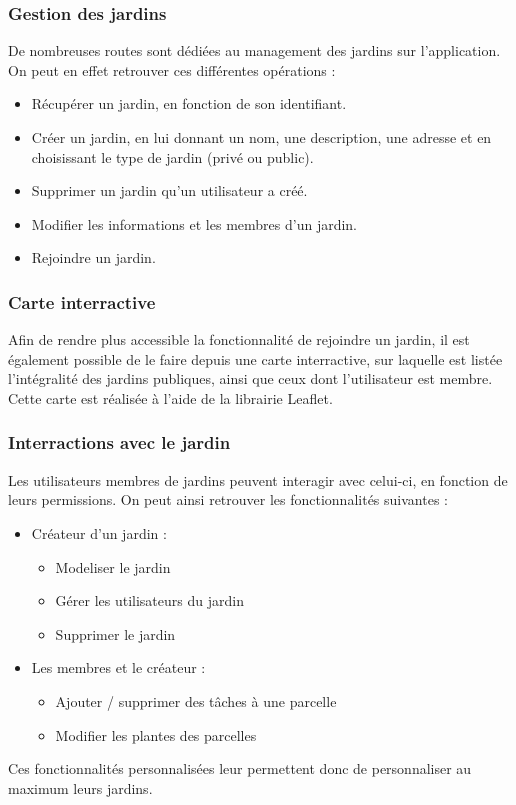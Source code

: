 \documentclass[french,a4paper]{article}
\begin{document}
\subsubsection{Gestion des jardins}
De nombreuses routes sont dédiées au management des jardins sur l'application. On peut en effet retrouver ces différentes opérations :
\begin{itemize}
    \item Récupérer un jardin, en fonction de son identifiant.
    \item Créer un jardin, en lui donnant un nom, une description, une adresse et en choisissant le type de jardin (privé ou public).
    \item Supprimer un jardin qu'un utilisateur a créé.
    \item Modifier les informations et les membres d'un jardin.
    \item Rejoindre un jardin.
\end{itemize}

\subsubsection{Carte interractive}
Afin de rendre plus accessible la fonctionnalité de rejoindre un jardin, il est également possible de le faire depuis une carte interractive, sur laquelle est listée l'intégralité des jardins publiques, ainsi que ceux dont l'utilisateur est membre. Cette carte est réalisée à l'aide de la librairie Leaflet.

\subsubsection{Interractions avec le jardin}
Les utilisateurs membres de jardins peuvent interagir avec celui-ci, en fonction de leurs permissions. On peut ainsi retrouver les fonctionnalités suivantes :
\begin{itemize}
    \item Créateur d'un jardin :
          \begin{itemize}
              \item Modeliser le jardin
              \item Gérer les utilisateurs du jardin
              \item Supprimer le jardin
          \end{itemize}
    \item Les membres et le créateur :
          \begin{itemize}
              \item Ajouter / supprimer des tâches à une parcelle
              \item Modifier les plantes des parcelles
          \end{itemize}
\end{itemize}
Ces fonctionnalités personnalisées leur permettent donc de personnaliser au maximum leurs jardins.
\end{document}
